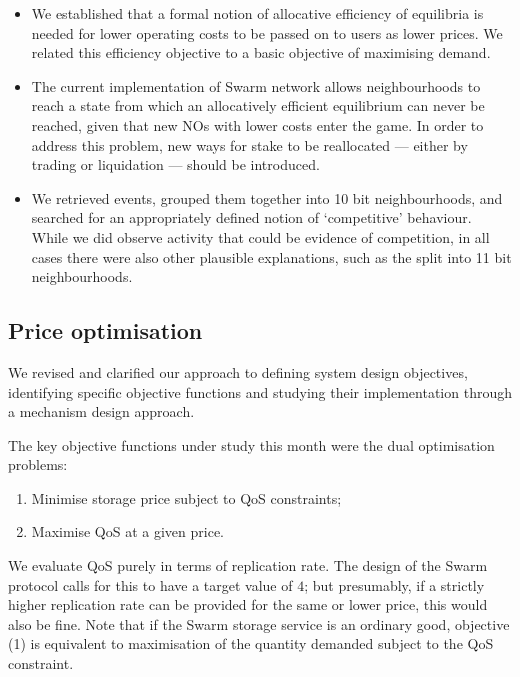 \begin{itemize}
  \item We established that a formal notion of allocative efficiency of equilibria is needed for lower operating costs to be passed on to users as lower prices. We related this efficiency objective to a basic objective of maximising demand.
  \item The current implementation of Swarm network allows neighbourhoods to reach a state from which an allocatively efficient equilibrium can never be reached, given that new NOs with lower costs enter the game.
  In order to address this problem, new ways for stake to be reallocated --- either by trading or liquidation --- should be introduced.
  \item We retrieved  events, grouped them together into 10 bit neighbourhoods, and searched for an appropriately defined notion of `competitive' behaviour.
  While we did observe activity that could be evidence of competition, in all cases there were also other plausible explanations, such as the split into 11 bit neighbourhoods.
\end{itemize}

\subsection*{Price optimisation}

We revised and clarified our approach to defining system design objectives, identifying specific objective functions and studying their implementation through a mechanism design approach.

The key objective functions under study this month were the dual optimisation problems:
\begin{enumerate}
  \item Minimise storage price subject to QoS constraints;
  \item Maximise QoS at a given price.
\end{enumerate}
%
We evaluate QoS purely in terms of replication rate.
%
The design of the Swarm protocol calls for this to have a target value of $4$; but presumably, if a strictly higher replication rate can be provided for the same or lower price, this would also be fine.
%
Note that if the Swarm storage service is an ordinary good, objective (1) is equivalent to maximisation of the quantity demanded subject to the QoS constraint.

